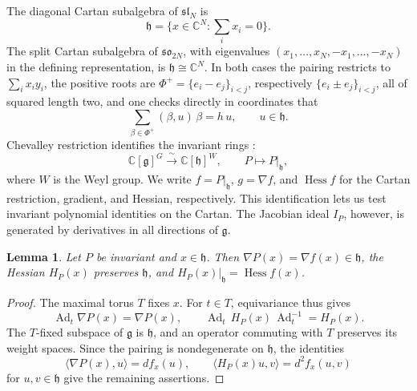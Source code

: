 \documentclass[10pt,reqno]{amsart}
\numberwithin{equation}{section}
\theoremstyle{plain}
\newtheorem{lemma}[theorem]{Lemma}
\theoremstyle{definition}
\DeclareMathOperator{\Ad}{Ad}
\DeclareMathOperator{\Hess}{Hess}
\newcommand{\ip}[2]{\langle #1, #2\rangle}
\begin{document}
The diagonal Cartan subalgebra of 
$\mathfrak{sl}_N$ is
\begin{equation*}
    \mathfrak{h}=\{x\in\mathbb{C}^N:\sum_ix_i=0\}.
\end{equation*}
The split Cartan subalgebra of $\mathfrak{so}_{2N}$, with eigenvalues $(x_1,\dots,x_N,-x_1,\dots,-x_N)$ in the defining representation, is $\mathfrak{h}\cong\mathbb{C}^N$. In both cases the pairing restricts to $\sum_ix_iy_i$, the positive roots are $\Phi^+=\{e_i-e_j\}_{i<j}$, respectively $\{e_i\pm e_j\}_{i<j}$, all of squared length two, and one checks directly in coordinates that
\begin{equation}\label{eq:casimir}
	\sum_{\beta\in\Phi^+}(\beta,u)\,\beta=h\,u,\qquad u\in\mathfrak{h} .
\end{equation}
Chevalley restriction identifies the invariant rings \cite{GW,Kostant}:
\begin{equation*}
    \mathbb C[\mathfrak g]^G\xrightarrow{\ \sim\ }\mathbb C[\mathfrak h]^W,
    \qquad P\longmapsto P|_{\mathfrak h},
\end{equation*}
where $W$ is the Weyl group. We write $f=P|_\mathfrak{h}$, $g=\nabla f$, and $\Hess f$ for the Cartan restriction, gradient, and Hessian, respectively. This identification lets us test invariant polynomial identities on the Cartan. The Jacobian ideal $I_P$, however, is generated by derivatives in all directions of $\mathfrak g$.

\begin{lemma}\label{lem:chevalley}
Let $P$ be invariant and $x\in\mathfrak{h}$. Then $\nabla P(x)=\nabla f(x)\in\mathfrak{h}$, the Hessian $H_P(x)$ preserves $\mathfrak{h}$, and $H_P(x)|_\mathfrak{h}=\Hess f(x)$.
\end{lemma}

\begin{proof}
The maximal torus $T$ fixes $x$. For $t\in T$, equivariance thus gives
\begin{equation*}
	\Ad_t\nabla P(x)=\nabla P(x),\qquad \Ad_t\,H_P(x)\,\Ad_t^{-1}=H_P(x).
\end{equation*} The $T$-fixed subspace of $\mathfrak{g}$ is $\mathfrak{h}$, and an operator commuting with $T$ preserves its weight spaces. Since the pairing is nondegenerate on $\mathfrak{h}$, the identities 
\begin{equation*}
    \ip{\nabla P(x)}u=df_x(u),\qquad \ip{H_P(x)u}v=d^2f_x(u,v)
\end{equation*}
for $u,v\in\mathfrak{h}$ give the remaining assertions.
\end{proof}
\end{document}
